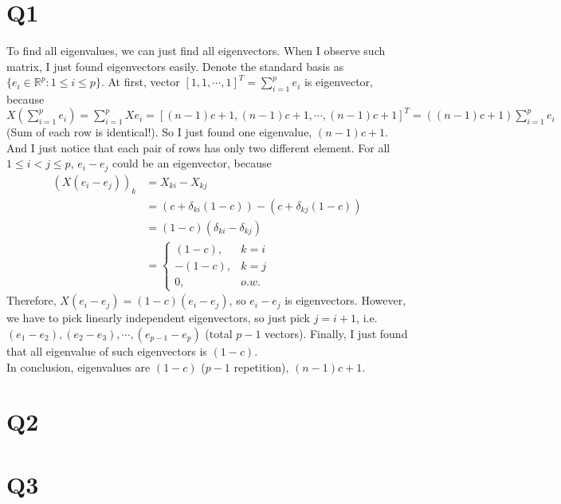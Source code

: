 \documentclass{article}
\begin{document}
\pagestyle{fancy}

\section{Q1}

To find all eigenvalues, we can just find all eigenvectors.
When I observe such matrix, I just found eigenvectors easily.
Denote the standard basis as $\{e_i \in \mathbb{R}^p: 1 \leq i \leq p\}$.
At first, vector $[1, 1, \cdots, 1]^T=\sum\limits_{i=1}^{p} e_i$ is eigenvector,
    because $X(\sum\limits_{i=1}^{p} e_i)
    = \sum\limits_{i=1}^{p} Xe_i
    = [(n-1)c+1, (n-1)c+1, \cdots, (n-1)c+1]^T
    = ((n-1)c+1)\sum\limits_{i=1}^{p} e_i$ (Sum of each row is identical!).
So I just found one eigenvalue, $(n-1)c+1$. \\

And I just notice that each pair of rows has only two different element.
For all $1 \leq i < j \leq p$, $e_i - e_j$ could be an eigenvector, because
\begin{align*}
    (X(e_i-e_j))_k &= X_{ki} - X_{kj} \\
    &= (c + \delta_{ki}(1-c)) - (c + \delta_{kj}(1-c)) \\
    &= (1-c)(\delta_{ki} - \delta_{kj}) \\
    &=
    \begin{cases}
        (1-c), & k=i \\
        -(1-c), & k=j \\
        0, & o.w.
    \end{cases}
\end{align*}
Therefore, $X(e_i-e_j) = (1-c)(e_i-e_j)$, so $e_i-e_j$ is eigenvectors.
However, we have to pick linearly independent eigenvectors, so just pick $j=i+1$, i.e.
    $(e_1-e_2), (e_2-e_3), \cdots, (e_{p-1}-e_p)$ (total $p-1$ vectors).
Finally, I just found that all eigenvalue of such eigenvectors is $(1-c)$. \\

In conclusion, eigenvalues are $(1-c)$ ($p-1$ repetition), $(n-1)c+1$.

\section{Q2}

\section{Q3}
\end{document}

